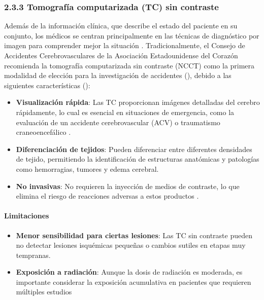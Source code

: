 \subsubsection{2.3.3 Tomografía computarizada (TC) sin contraste}
Además de la información clínica, que describe el estado del paciente en su conjunto, los médicos se centran principalmente en las técnicas de diagnóstico por imagen para comprender mejor la situación . Tradicionalmente, el Consejo de Accidentes Cerebrovasculares de la Asociación Estadounidense del Corazón recomienda la tomografía computarizada sin contraste (NCCT) como la primera modalidad de elección para la investigación de accidentes (\cite{BORSOS2024102719}), debido a las siguientes características  (\cite{peralta_agudelo_2023}):
\begin{itemize}
    \item \textbf{Visualización rápida}: Las TC proporcionan imágenes detalladas del cerebro rápidamente, lo cual es esencial en situaciones de emergencia, como la evaluación de un accidente cerebrovascular (ACV) o traumatismo craneoencefálico .
    \item \textbf{Diferenciación de tejidos}: Pueden diferenciar entre diferentes densidades de tejido, permitiendo la identificación de estructuras anatómicas y patologías como hemorragias, tumores y edema cerebral.
    \item \textbf{No invasivas}: No requieren la inyección de medios de contraste, lo que elimina el riesgo de reacciones adversas a estos productos .
\end{itemize}


\paragraph{Limitaciones}
\begin{itemize}
\item \textbf{Menor sensibilidad para ciertas lesiones}: Las TC sin contraste pueden no detectar lesiones isquémicas pequeñas o cambios sutiles en etapas muy tempranas.
\item \textbf{Exposición a radiación}: Aunque la dosis de radiación es moderada, es importante considerar la exposición acumulativa en pacientes que requieren múltiples estudios 
\end{itemize}

